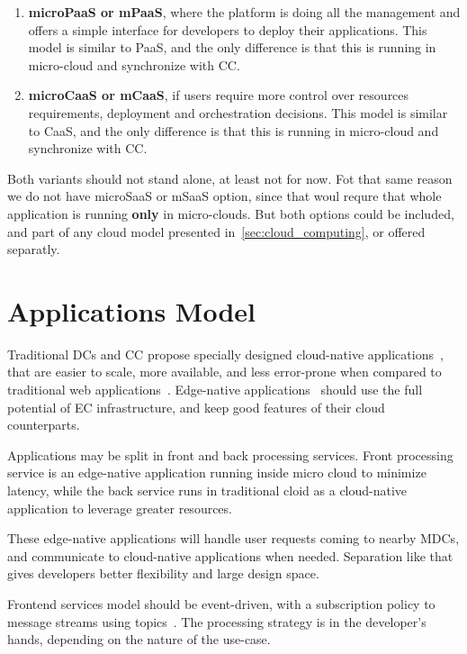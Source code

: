 \begin{enumerate}[start=1,label={(\bfseries \arabic*)}]
	\item \textbf{microPaaS or mPaaS}, where the platform is doing all the management and offers a simple interface for developers to deploy their applications. This model is similar to PaaS, and the only difference is that this is running in micro-cloud and synchronize with CC.
	\item \textbf{microCaaS or mCaaS}, if users require more control over resources requirements, deployment and orchestration decisions. This model is similar to CaaS, and the only difference is that this is running in micro-cloud and synchronize with CC.
\end{enumerate}

Both variants should not stand alone, at least not for now. Fot that same reason we do not have microSaaS or mSaaS option, since that woul requre that whole application is running \textbf{only} in micro-clouds. But both options could be included, and part of any cloud model presented in~\ref{sec:cloud_computing}, or offered separatly.
%
%
\section{Applications Model}\label{sec:application_model}
%
Traditional DCs and CC propose specially designed cloud-native applications~\cite{GannonBS17}, that are easier to scale, more available, and less error-prone when compared to traditional web applications~\cite{GannonBS17}. Edge-native applications~\cite{SatyanarayananK19} should use the full potential of EC infrastructure, and keep good features of their cloud counterparts. 

Applications may be split in front and back processing services. Front processing service is an edge-native application running inside micro cloud to minimize latency, while the back service runs in traditional cloid as a cloud-native application to leverage greater resources. 

These edge-native applications will handle user requests coming to nearby MDCs, and communicate to cloud-native applications when needed. Separation like that gives developers better flexibility and large design space. 

Frontend services model should be event-driven, with a subscription policy to message streams using topics~\cite{inproceedingsBeck}. The processing strategy is in the developer's hands, depending on the nature of the use-case. 

